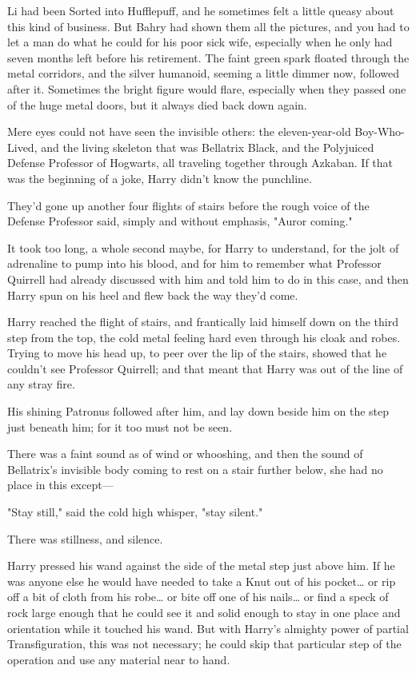 Li had been Sorted into Hufflepuff, and he sometimes felt a little queasy about
this kind of business. But Bahry had shown them all the pictures, and you had
to let a man do what he could for his poor sick wife, especially when he only
had seven months left before his retirement.
\later
The faint green spark floated through the metal corridors, and the silver
humanoid, seeming a little dimmer now, followed after it. Sometimes the bright
figure would flare, especially when they passed one of the huge metal doors,
but it always died back down again.

Mere eyes could not have seen the invisible others: the eleven-year-old
Boy-Who-Lived, and the living skeleton that was Bellatrix Black, and the
Polyjuiced Defense Professor of Hogwarts, all traveling together through
Azkaban. If that was the beginning of a joke, Harry didn't know the punchline.

They'd gone up another four flights of stairs before the rough voice of the
Defense Professor said, simply and without emphasis, "Auror coming."

It took too long, a whole second maybe, for Harry to understand, for the jolt
of adrenaline to pump into his blood, and for him to remember what Professor
Quirrell had already discussed with him and told him to do in this case, and
then Harry spun on his heel and flew back the way they'd come.

Harry reached the flight of stairs, and frantically laid himself down on the
third step from the top, the cold metal feeling hard even through his cloak and
robes. Trying to move his head up, to peer over the lip of the stairs, showed
that he couldn't see Professor Quirrell; and that meant that Harry was out of
the line of any stray fire.

His shining Patronus followed after him, and lay down beside him on the step
just beneath him; for it too must not be seen.

There was a faint sound as of wind or whooshing, and then the sound of
Bellatrix's invisible body coming to rest on a stair further below, she had no
place in this except---

"Stay still," said the cold high whisper, "stay silent."

There was stillness, and silence.

Harry pressed his wand against the side of the metal step just above him. If he
was anyone else he would have needed to take a Knut out of his pocket{\ldots}
or rip off a bit of cloth from his robe{\ldots} or bite off one of his
nails{\ldots} or find a speck of rock large enough that he could see it and
solid enough to stay in one place and orientation while it touched his wand.
But with Harry's almighty power of partial Transfiguration, this was not
necessary; he could skip that particular step of the operation and use any
material near to hand.

